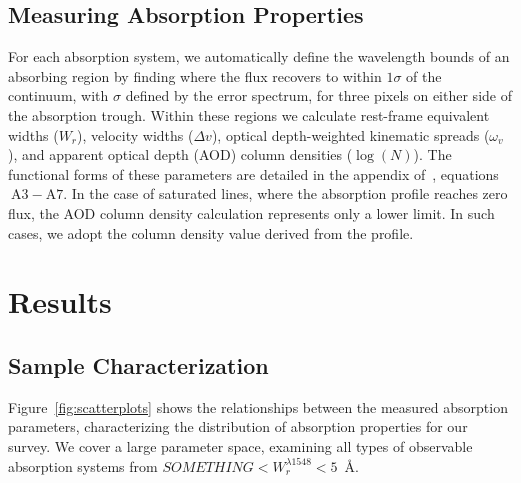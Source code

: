 \documentclass[linenumbers,twocolumn]{aastex61}
\begin{document}

\subsection{Measuring Absorption Properties}
\label{sec:measuring}

For each absorption system, we automatically define the wavelength bounds of an absorbing region by finding where the flux recovers to within $1\sigma$ of the continuum, with $\sigma$ defined by the error spectrum, for three pixels on either side of the absorption trough. Within these regions we calculate rest-frame equivalent widths ($W_r$), velocity widths ($\Delta v$), optical depth-weighted kinematic spreads ($\omega_v$), and apparent optical depth (AOD) column densities ($\log(N)$). The functional forms of these parameters are detailed in the appendix of~\cite{Churchill2001}, equations$~\mathrm{A3 - A7}$. In the case of saturated lines, where the absorption profile reaches zero flux, the AOD column density calculation represents only a lower limit. In such cases, we adopt the column density value derived from the {} profile.


\section{Results}
\label{sec:results}

\subsection{Sample Characterization}
\label{sec:sample}

\begin{figure*}[bth]
\caption{Correlations between measured absorption properties for survey sample. $\log N$ is the AOD column density, $\omega_v$ is the kinematic spread, $W_r^{1548}$ is the rest frame {} equivalent width, and $z$ is the absorption redshift.}
\label{fig:scatterplots}
\end{figure*}

Figure~\ref{fig:scatterplots} shows the relationships between the measured absorption parameters, characterizing the distribution of absorption properties for our survey. We cover a large parameter space, examining all types of observable absorption systems from $SOMETHING < W_r^{\lambda1548} < 5$~{\AA}.
\end{document}
